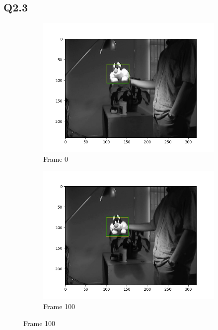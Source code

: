\documentclass{article} %
\begin{document}
    \subsection*{Q2.3}
    \begin{figure}[H]
        \centering
        \begin{subfigure}[b]{0.30\textwidth}
            \centering
            \includegraphics[width=\textwidth]{q2,3_frame0.png}
            \caption{Frame 0}
        \end{subfigure}
        \begin{subfigure}[b]{0.30\textwidth}
            \centering
            \includegraphics[width=\textwidth]{q2,3_frame100.png}
            \caption{Frame 100}

\end{subfigure}
\end{figure}
\end{document}

